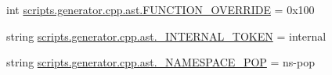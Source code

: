\begin{DoxyCompactItemize}
\item 
int \mbox{\hyperlink{namespacescripts_1_1generator_1_1cpp_1_1ast_a0bcd7669c53568ad153f9bd07b8bb229}{scripts.\+generator.\+cpp.\+ast.\+F\+U\+N\+C\+T\+I\+O\+N\+\_\+\+O\+V\+E\+R\+R\+I\+DE}} = 0x100
\item 
string \mbox{\hyperlink{namespacescripts_1_1generator_1_1cpp_1_1ast_a5112ba149e02a0c68fde844807462539}{scripts.\+generator.\+cpp.\+ast.\+\_\+\+I\+N\+T\+E\+R\+N\+A\+L\+\_\+\+T\+O\+K\+EN}} = \textquotesingle{}internal\textquotesingle{}
\item 
string \mbox{\hyperlink{namespacescripts_1_1generator_1_1cpp_1_1ast_a99f1dc6a251023217756484a19a7ef01}{scripts.\+generator.\+cpp.\+ast.\+\_\+\+N\+A\+M\+E\+S\+P\+A\+C\+E\+\_\+\+P\+OP}} = \textquotesingle{}ns-\/pop\textquotesingle{}
\end{DoxyCompactItemize}
